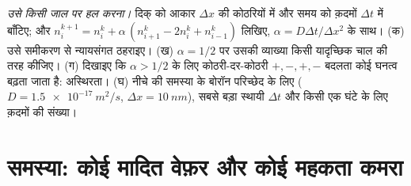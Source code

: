 \begin{exercise}[$\star\star\star$]\label{exo:b2:particle-diffusion:12}
\emph{उसे किसी जाल पर हल करना।} दिक् को आकार $\Delta x$ की कोठरियों में
और समय को क़दमों $\Delta t$ में बाँटिए; और
$n_i^{k+1} = n_i^k + \alpha\,(n_{i+1}^k
- 2n_i^k + n_{i-1}^k)$ लिखिए, $\alpha = D\Delta t/\Delta x^2$ के साथ। (क) उसे समीकरण से न्यायसंगत
ठहराइए। (ख) $\alpha =
1/2$ पर उसकी व्याख्या किसी यादृच्छिक चाल की तरह कीजिए। (ग) दिखाइए कि $\alpha > 1/2$ के लिए
कोठरी-दर-कोठरी $+,-,+,-$ बदलता कोई घनत्व बढ़ता जाता है: अस्थिरता। (घ) नीचे की समस्या
के बोरॉन परिच्छेद के लिए ($D = \qty{1.5e-17}{m^2/s}$, $\Delta x = \qty{10}{nm}$),
सबसे बड़ा स्थायी $\Delta t$ और किसी एक घंटे के लिए क़दमों की संख्या।
\end{exercise}

\section{समस्या: कोई मादित वेफ़र और कोई महकता कमरा}

